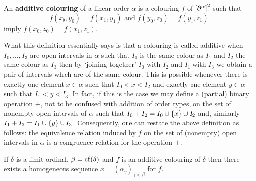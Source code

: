     \begin{dfn}
        An \textbf{additive colouring} of a linear order $\alpha$ is a colouring $f$ of $\left[\partial^{\alpha}\right]^{2}$ such that
        \begin{equation}
            f(x_0,y_0)=f(x_1,y_1)\text{ and }f(y_0,z_0)=f(y_1,z_1)
        \end{equation}
        imply $f(x_0,z_0)=f(x_1,z_1)$.
    \end{dfn}

    \begin{rem}
        What this definition essentially says is that a colouring is called additive when $I_0,\dotsc, I_3$ are open intervals in $\alpha$ such that $I_0$ is the same colour as $I_1$ and $I_2$ the same colour as $I_3$ then by `joining together' $I_0$ with $I_2$ and $I_1$ with $I_3$ we obtain a pair of intervals which are of the same colour.  This is possible whenever there is exactly one element $x\in\alpha$ such that $I_0<x<I_2$ and exactly one element $y\in\alpha$ such that $I_1<y<I_3$.  In fact, if this is the case we may define a (partial) binary operation $+$, not to be confused with addition of order types, on the set of nonempty open intervals of $\alpha$ such that $I_0+I_2=I_0\cup\{x\}\cup I_2$ and, similarly $I_1+I_3=I_1\cup\{y\}\cup I_3$.  Consequently, one can restate the above definition as follows: the equivalence relation induced by $f$ on the set of (nonempty) open intervals in $\alpha$ is a congruence relation for the operation $+$.
    \end{rem}

    \begin{thm}
        If $\delta$ is a limit ordinal, $\beta=\operatorname{cf}(\delta)$ and $f$ is an additive colouring of $\delta$ then there exists a homogeneous sequence $x=(\alpha_\gamma)_{\gamma<\beta}$ for $f$.
    \end{thm}

